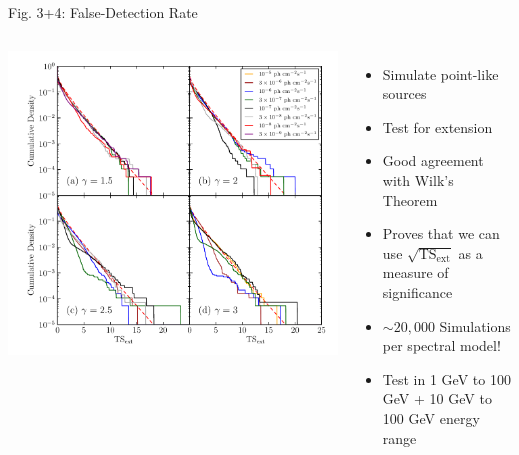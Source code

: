 \documentclass[12pt]{beamer}
\begin{document}
\begin{frame}{Fig. 3+4: False-Detection Rate}
  \begin{columns}
    \includegraphics[scale=0.4]{plots/ts_ext_emin_1000_color.pdf}
    \begin{itemize}
      \item Simulate point-like sources
      \item Test for extension
      \item Good agreement with Wilk's Theorem
      \item Proves that we can use $\sqrt{\mathrm{TS}_\mathrm{ext}}$
        as a measure of significance
      \item $\sim 20,000$ Simulations per spectral model!
      \item Test in 1 GeV to 100 GeV + 10 GeV to 100 GeV
        energy range
    \end{itemize}
  \end{columns}
\end{frame}
\end{document}
